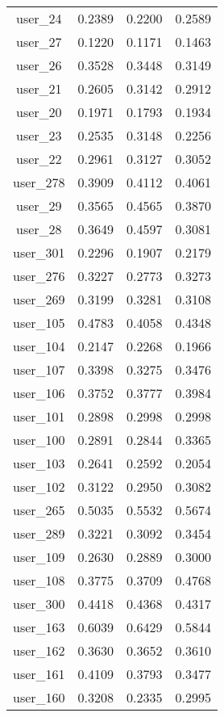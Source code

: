 \begin{table}[ht]
\begin{tabular}{|c|c|c|c|}
user_24  &  0.2389   &  0.2200   &  0.2589 \\ 
user_27  &  0.1220   &  0.1171   &  0.1463 \\ 
user_26  &  0.3528   &  0.3448   &  0.3149 \\ 
user_21  &  0.2605   &  0.3142   &  0.2912 \\ 
user_20  &  0.1971   &  0.1793   &  0.1934 \\ 
user_23  &  0.2535   &  0.3148   &  0.2256 \\ 
user_22  &  0.2961   &  0.3127   &  0.3052 \\ 
user_278  &  0.3909   &  0.4112   &  0.4061 \\ 
user_29  &  0.3565   &  0.4565   &  0.3870 \\ 
user_28  &  0.3649   &  0.4597   &  0.3081 \\ 
user_301  &  0.2296   &  0.1907   &  0.2179 \\ 
user_276  &  0.3227   &  0.2773   &  0.3273 \\ 
user_269  &  0.3199   &  0.3281   &  0.3108 \\ 
user_105  &  0.4783   &  0.4058   &  0.4348 \\ 
user_104  &  0.2147   &  0.2268   &  0.1966 \\ 
user_107  &  0.3398   &  0.3275   &  0.3476 \\ 
user_106  &  0.3752   &  0.3777   &  0.3984 \\ 
user_101  &  0.2898   &  0.2998   &  0.2998 \\ 
user_100  &  0.2891   &  0.2844   &  0.3365 \\ 
user_103  &  0.2641   &  0.2592   &  0.2054 \\ 
user_102  &  0.3122   &  0.2950   &  0.3082 \\ 
user_265  &  0.5035   &  0.5532   &  0.5674 \\ 
user_289  &  0.3221   &  0.3092   &  0.3454 \\ 
user_109  &  0.2630   &  0.2889   &  0.3000 \\ 
user_108  &  0.3775   &  0.3709   &  0.4768 \\ 
user_300  &  0.4418   &  0.4368   &  0.4317 \\ 
user_163  &  0.6039   &  0.6429   &  0.5844 \\ 
user_162  &  0.3630   &  0.3652   &  0.3610 \\ 
user_161  &  0.4109   &  0.3793   &  0.3477 \\ 
user_160  &  0.3208   &  0.2335   &  0.2995 \\ 

\end{tabular}
\end{table}
